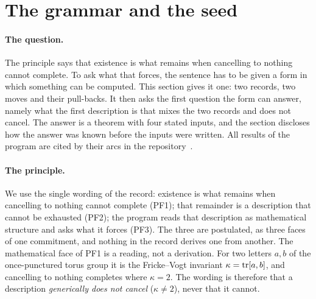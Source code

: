 \section{The grammar and the seed}\label{sec:grammar}

\paragraph{The question.}
The principle says that existence is what remains when cancelling to nothing cannot complete. To ask what that forces,
the sentence has to be given a form in which something can be computed. This section gives it one: two records, two
moves and their pull-backs. It then asks the first question the form can answer, namely what the first description is
that mixes the two records and does not cancel. The answer is a theorem with four stated inputs, and the section
discloses how the answer was known before the inputs were written. All results of the program are cited by their
arcs in the repository~\cite{OriginAxiomRepo}.

\paragraph{The principle.}
We use the single wording of the record: existence is what remains when cancelling to nothing cannot complete (PF1);
that remainder is a description that cannot be exhausted (PF2); the program reads that description as mathematical
structure and asks what it forces (PF3). The three are postulated, as three faces of one commitment, and nothing in
the record derives one from another. The mathematical face of PF1 is a reading, not a derivation. For two letters $a,b$
of the once-punctured torus group it is the Fricke--Vogt invariant $\kappa=\operatorname{tr}[a,b]$, and cancelling to nothing
completes where $\kappa=2$. The wording is therefore that a description \emph{generically does not cancel}
($\kappa\neq 2$), never that it cannot.


